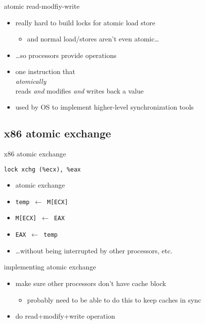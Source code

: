 \begin{frame}{atomic read-modfiy-write}
    \begin{itemize}
    \item really hard to build locks for atomic load store
        \begin{itemize}
        \item and normal load/stores aren't even atomic\ldots
        \end{itemize}
    \item \ldots so processors provide  operations
        \vspace{.5cm}
    \item one instruction that\\\textit{atomically}\\reads \textit{and} modifies \textit{and} writes back a value
    \vspace{.5cm}
    \item used by OS to implement higher-level synchronization tools
    \end{itemize}
\end{frame}

\subsection{x86 atomic exchange} 
\begin{frame}[fragile,label=atomicXchg]{x86 atomic exchange}
\begin{lstlisting}[language=myasm]
lock xchg (%ecx), %eax
\end{lstlisting}
\begin{itemize}
    \item atomic exchange
    \item \texttt{temp $\leftarrow$ M[ECX]}
    \item \texttt{M[ECX] $\leftarrow$ EAX}
    \item \texttt{EAX $\leftarrow$ temp}
    \item \ldots without being interrupted by other processors, etc.
\end{itemize}
\end{frame}


\begin{frame}{implementing atomic exchange}
    \begin{itemize}
    \item make sure other processors don't have cache block
    \begin{itemize}
        \item probably need to be able to do this to keep caches in sync
    \end{itemize}
    \item do read+modify+write operation
    \end{itemize}
\end{frame}

